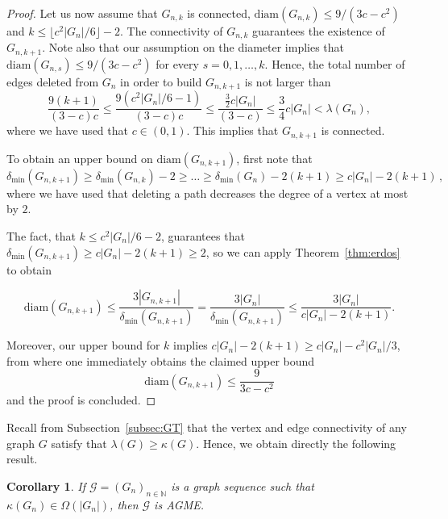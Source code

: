 \documentclass[a4paper,onecolumn,accepted=2024-12-14]{quantumarticle}
\newtheorem{corollary}[theorem]{Corollary}
\theoremstyle{plain}
\newcommand{\cG}{{\mathcal G}}         %
\newcommand{\N}{\mathbb{N}} %
\begin{document}
\begin{proof}
Let us now assume that $G_{n,k}$ is connected, $\textrm{diam}(G_{n,k})\leq 9/(3c-c^2)$ and $k\leq \lfloor c^2|G_n|/6\rfloor-2$. The connectivity of $G_{n,k}$ guarantees the existence of $G_{n,k+1}$. Note also that our assumption on the diameter implies that $\textrm{diam}(G_{n,s})\leq 9/(3c-c^2)$ for every $s=0,1,\ldots, k$. Hence, the total number of edges deleted from $G_n$ in order to build $G_{n,k+1}$ is not larger than
\begin{equation}
\frac{9(k+1)}{(3-c)c}\leq \frac{9\left(c^2|G_n|/6-1\right)}{(3-c)c}\leq  \frac{\frac{3}{2} c|G_n|}{(3-c)}\leq \frac{3}{4}c|G_n|<\lambda(G_n),
\end{equation}where we have used that $c\in (0,1)$. This implies that $G_{n,k+1}$ is connected.

To obtain an upper bound on $\textrm{diam}(G_{n,k+1})$, first note that
\begin{equation}
\delta_{\mathrm{min}}(G_{n,k+1})\geq\delta_{\mathrm{min}}(G_{n,k})-2\geq\ldots\geq \delta_{\mathrm{min}}(G_{n})-2(k+1)\geq c|G_n|-2(k+1)\,,
\end{equation}
where we have used that deleting a path decreases the degree of a vertex at most by $2$.

The fact, that $k\leq c^2|G_n|/6-2$, guarantees that $\delta_{\mathrm{min}}(G_{n,k+1})\geq  c|G_n|-2(k+1)\geq 2$, so we can apply Theorem~\ref{thm:erdos} to obtain

\begin{equation}
\textrm{diam}(G_{n,k+1})\leq\frac{3|G_{n,k+1}|}{\delta_{\mathrm{min}}(G_{n,k+1})}=\frac{3|G_{n}|}{\delta_{\mathrm{min}}(G_{n,k+1})}\leq\frac{3|G_n|}{c|G_n|-2(k+1)}.
\end{equation}

Moreover, our upper bound for $k$ implies $c|G_n|-2(k+1)\geq c|G_n|-c^2|G_n|/3$, from where one immediately obtains the claimed upper bound
\begin{equation}
\textrm{diam}(G_{n,k+1})\leq \frac{9}{3c-c^2}
\end{equation}
and the proof is concluded.
\end{proof}


Recall from Subsection~\ref{subsec:GT} that the vertex and edge connectivity of any graph $G$ satisfy that  $\lambda(G)\geq \kappa(G)$. Hence, we obtain directly the following result.
\begin{corollary}\label{th:kappa}
If $\cG=(G_n)_{n\in\N}$ is a graph sequence such that
$\kappa(G_n)\in\Omega(|G_n|)$, then $\cG$ is AGME.
\end{corollary}
\end{document}
